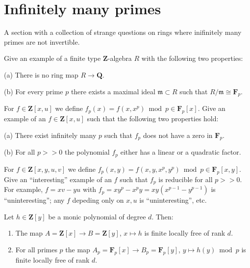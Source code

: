 \section{Infinitely many primes}
\label{section-many-primes}

\noindent
A section with a collection of strange questions on rings where
inifinitely many primes are not invertible.

\begin{exercise}
\label{exercise-not-in-Q}
Give an example of a finite type ${\mathbf Z}$-algebra $R$
with the following two properties:
\item{(a)} There is no ring map $R \to {\mathbf Q}$.
\item{(b)} For every prime $p$ there exists a maximal ideal
${\mathfrak m} \subset R$ such that $R/{\mathfrak m} \cong {\mathbf F}_p$.
\end{exercise}

\begin{exercise}
\label{exercise-strange-fp-1}
For $f \in {\mathbf Z}[x, u]$ we define $f_p(x)
= f(x, x^p) \bmod p \in {\mathbf F}_p[x]$. Give an example
of an $f \in {\mathbf Z}[x, u]$ such that the following two
properties hold:
\item{(a)} There exist infinitely many $p$ such that $f_p$
does not have a zero in ${\mathbf F}_p$.
\item{(b)} For all $p>>0$ the polynomial $f_p$ either has
a linear or a quadratic factor.
\end{exercise}

\begin{exercise}
\label{exercise-strange-fp-2}
For $f \in {\mathbf Z}[x, y, u, v]$ we define $f_p(x, y)
= f(x, y, x^p, y^p) \bmod p \in {\mathbf F}_p[x, y]$. Give an ``interesting''
example of an $f$ such that $f_p$ is reducible for all $p>>0$.
For example, $f = xv-yu$ with $f_p = xy^p-x^py = xy(x^{p-1}-y^{p-1})$ is
``uninteresting''; any $f$ depeding only on $x, u$ is ``uninteresting'',
etc.
\end{exercise}

\begin{remark}
\label{remark-strange-fp}
Let $h \in {\mathbf Z}[y]$ be a monic polynomial of degree $d$.
Then:
\begin{enumerate}
\item The map $A = {\mathbf Z}[x] \to B ={\mathbf Z}[y]$,
$x \mapsto h$ is finite locally free of rank $d$.
\item For all primes $p$ the map
$A_p = {\mathbf F}_p[x]\to B_p = {\mathbf F}_p[y]$,
$y \mapsto h(y) \bmod p$ is finite locally free of rank $d$.
\end{enumerate}
\end{remark}

